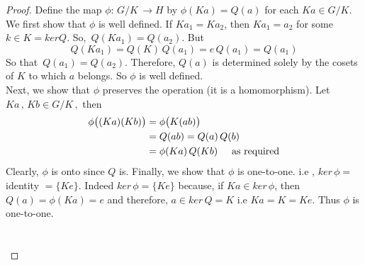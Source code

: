 \documentclass[11pt,a4paper]{article}
\theoremstyle{definition}
\begin{document}
\begin{proof}
Define the map $\phi:\, G\big/K \, \longrightarrow H$ by $\phi (Ka) = Q(a)$ for each $Ka\in G\big/K$. We first show that $\phi$ is well defined.  If $Ka_1 = Ka_2$, then $Ka_1 = a_2$ for some $k\in K = ker Q$. So, $\, Q(Ka_1) = Q(a_2)$. But $$Q(Ka_1) = Q(K)\, Q(a_1) = e\, Q(a_1) = Q(a_1)$$
So that $\, Q(a_1) =  Q(a_2)$. Therefore, $Q(a)$ is determined solely by the cosets of $K$ to which $a$ belongs. So $\phi$ is well defined.\\
Next, we show that $\phi$ preserves the operation (it is a homomorphism). Let $Ka\, ,\, Kb\in G\big/K\, , $ then 
\begin{align*}
\phi\big((Ka)(Kb)\big) & = \phi\big(K(ab)\big)\\
& = Q(ab) = Q(a)\, Q(b)\\
& = \phi(Ka)\, Q(Kb)\hspace{0.5cm}\text{as required}
\end{align*}
Clearly, $\phi$ is  onto since $Q$ is. Finally, we show that $\phi$ is one-to-one. i.e , $ker\, \phi =$ identity $= \{Ke\}$. Indeed $ker\, \phi = \{Ke\}$ because, if $Ka \in ker\, \phi$, then $Q(a) = \phi (Ka) = e$ and therefore, $a\in ker\, Q = K$ i.e $Ka = K = Ke$. Thus $\phi$ is one-to-one.\\\\\\ 
\end{proof}
\end{document}

